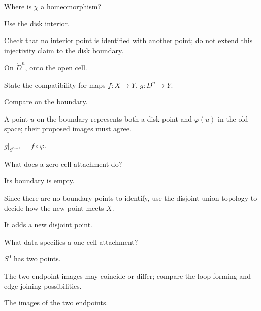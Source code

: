 \begin{exercise}\label{exr:viii05-04}
Where is \(\chi\) a homeomorphism?
\end{exercise}
\begin{hint}
Use the disk interior.

Check that no interior point is identified with another point; do not extend this injectivity claim to the disk boundary.
\end{hint}
\begin{solution}
On \(\mathring D^n\), onto the open cell.
\end{solution}

\begin{exercise}\label{exr:viii05-05}
State the compatibility for maps \(f:X\to Y\), \(g:D^n\to Y\).
\end{exercise}
\begin{hint}
Compare on the boundary.

A point \(u\) on the boundary represents both a disk point and \(\varphi(u)\) in the old space; their proposed images must agree.
\end{hint}
\begin{solution}
\(g|_{S^{n-1}}=f\circ\varphi\).
\end{solution}

\begin{exercise}\label{exr:viii05-06}
What does a zero-cell attachment do?
\end{exercise}
\begin{hint}
Its boundary is empty.

Since there are no boundary points to identify, use the disjoint-union topology to decide how the new point meets \(X\).
\end{hint}
\begin{solution}
It adds a new disjoint point.
\end{solution}

\begin{exercise}\label{exr:viii05-07}
What data specifies a one-cell attachment?
\end{exercise}
\begin{hint}
\(S^0\) has two points.

The two endpoint images may coincide or differ; compare the loop-forming and edge-joining possibilities.
\end{hint}
\begin{solution}
The images of the two endpoints.
\end{solution}

